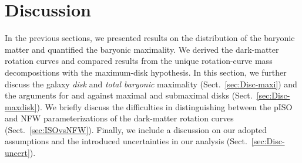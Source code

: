\documentclass[traditabstract]{aa} %
\begin{document}
\section{Discussion}
\label{sec:Discussion}
In the previous sections, we presented results on the distribution of the baryonic matter 
and quantified the baryonic maximality. We derived the dark-matter rotation curves and 
compared results from the unique rotation-curve mass decompositions with the maximum-disk 
hypothesis. In this section, we further discuss the galaxy {\it disk} and {\it total
baryonic} maximality (Sect.~\ref{sec:Disc-maxi}) and the arguments for and against maximal
and submaximal disks (Sect.~\ref{sec:Disc-maxdisk}). We briefly discuss the difficulties
in distinguishing between the pISO and NFW parameterizations of the dark-matter
rotation curves (Sect.~\ref{sec:ISOvsNFW}). Finally, we include a discussion on our
adopted assumptions and the introduced uncertainties in our analysis
(Sect.~\ref{sec:Disc-uncert}).
\end{document}
